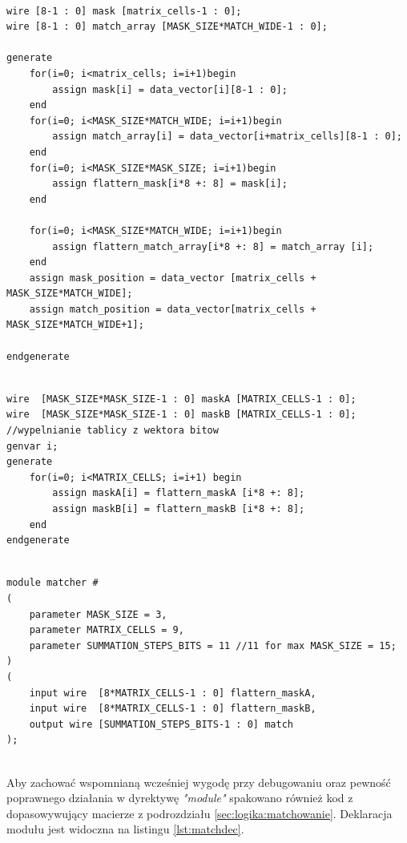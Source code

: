 \begin{lstlisting}[caption={oznaczenie części wektora danych "data\_vector"
    jako poszczególne zmienne oraz
    wypłaczczanie wektorów danych do wektorów bitów},label={lst:flat2bits}]

wire [8-1 : 0] mask [matrix_cells-1 : 0];
wire [8-1 : 0] match_array [MASK_SIZE*MATCH_WIDE-1 : 0];

generate
	for(i=0; i<matrix_cells; i=i+1)begin
		assign mask[i] = data_vector[i][8-1 : 0];
	end
	for(i=0; i<MASK_SIZE*MATCH_WIDE; i=i+1)begin
		assign match_array[i] = data_vector[i+matrix_cells][8-1 : 0];
	end
	for(i=0; i<MASK_SIZE*MASK_SIZE; i=i+1)begin
		assign flattern_mask[i*8 +: 8] = mask[i];
	end
        
	for(i=0; i<MASK_SIZE*MATCH_WIDE; i=i+1)begin
		assign flattern_match_array[i*8 +: 8] = match_array [i];
	end
	assign mask_position = data_vector [matrix_cells + MASK_SIZE*MATCH_WIDE];
	assign match_position = data_vector[matrix_cells + MASK_SIZE*MATCH_WIDE+1];

endgenerate
\end{lstlisting}

\begin{lstlisting}[label={lst:bits2vec},
    caption={odzyskiwanie struktury wektorów danych z wektora bitów}]

wire  [MASK_SIZE*MASK_SIZE-1 : 0] maskA [MATRIX_CELLS-1 : 0];
wire  [MASK_SIZE*MASK_SIZE-1 : 0] maskB [MATRIX_CELLS-1 : 0];
//wypelnianie tablicy z wektora bitow
genvar i;
generate
	for(i=0; i<MATRIX_CELLS; i=i+1) begin
		assign maskA[i] = flattern_maskA [i*8 +: 8];
		assign maskB[i] = flattern_maskB [i*8 +: 8];
	end
endgenerate

\end{lstlisting}

\begin{lstlisting}[label={lst:matchdec},
caption={deklaracja modułu realizującego dopasowywanie macierzy}]

module matcher #
(
	parameter MASK_SIZE = 3,
	parameter MATRIX_CELLS = 9,
	parameter SUMMATION_STEPS_BITS = 11 //11 for max MASK_SIZE = 15;
)
(
	input wire  [8*MATRIX_CELLS-1 : 0] flattern_maskA,
	input wire  [8*MATRIX_CELLS-1 : 0] flattern_maskB,
	output wire [SUMMATION_STEPS_BITS-1 : 0] match
);


\end{lstlisting}


Aby zachować wspomnianą wcześniej wygodę przy debugowaniu oraz pewność poprawnego działania
w dyrektywę \textit{"module"} spakowano również kod z dopasowywujący macierze
z podrozdziału \ref{sec:logika:matchowanie}. Deklaracja modułu jest widoczna na
listingu \ref{lst:matchdec}.

